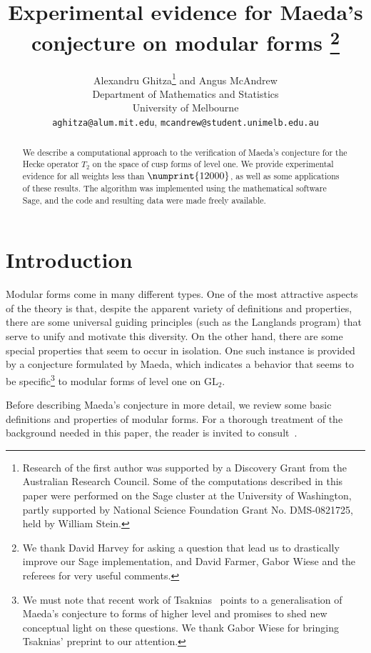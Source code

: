 \documentclass[11pt]{article}
\title{Experimental evidence for Maeda's conjecture on modular forms
\footnote{
We thank David Harvey for asking a question that lead us to
  drastically improve our Sage implementation, and David Farmer, Gabor Wiese
and the referees for very useful comments.}
}
\author{
Alexandru Ghitza\footnote{
  Research of the first author was supported by 
a Discovery Grant from the Australian Research Council.
Some of the computations described in this paper were performed on the Sage
cluster at the University of Washington, partly supported by National 
Science Foundation Grant No. DMS-0821725, held by William Stein.}  
{} and 
Angus McAndrew\\
Department of Mathematics and Statistics\\
University of Melbourne\\
{\tt aghitza@alum.mit.edu}, {\tt mcandrew@student.unimelb.edu.au}
}
\date{}
\theoremstyle{plain}
\theoremstyle{definition}
\theoremstyle{remark}
\numberwithin{equation}{section}
\newcommand{\bound}{\numprint{12000}}
\newcommand{\GL}{\mathrm{GL}}
\begin{document}
\thispagestyle{empty}

\maketitle
\begin{abstract}
  We describe a computational approach to the verification of Maeda's conjecture
  for the Hecke operator $T_2$ on the space of cusp forms of level one. We provide
  experimental evidence for all weights less than $\bound$, as well as some
  applications of these results.  The algorithm was implemented using the
  mathematical software Sage, and the code and resulting data were made
  freely available.
\end{abstract}


\section{Introduction}
\label{sect:introduction}
Modular forms come in many different types.  One of the most attractive
aspects of the theory is that, despite the apparent variety of definitions
and properties, there are some universal guiding principles (such as the
Langlands program) that serve to unify and motivate this diversity.  On the
other hand, there are some special properties that seem to occur in isolation.
One such instance is provided by a conjecture formulated by Maeda, which
indicates a behavior that seems to be specific\footnote{We must note that
  recent work of Tsaknias~\cite{Tsaknias} points to a generalisation of
Maeda's conjecture to forms of higher level and promises to shed new
conceptual light on these questions.  We thank Gabor Wiese for
bringing Tsaknias' preprint to our attention.} to modular forms of level one
on $\GL_2$.  

Before describing Maeda's conjecture in more detail, we review some basic 
definitions and properties of modular forms.  For a thorough treatment of
the background needed in this paper, the reader is invited to
consult~\cite{Stein}.
\end{document}
